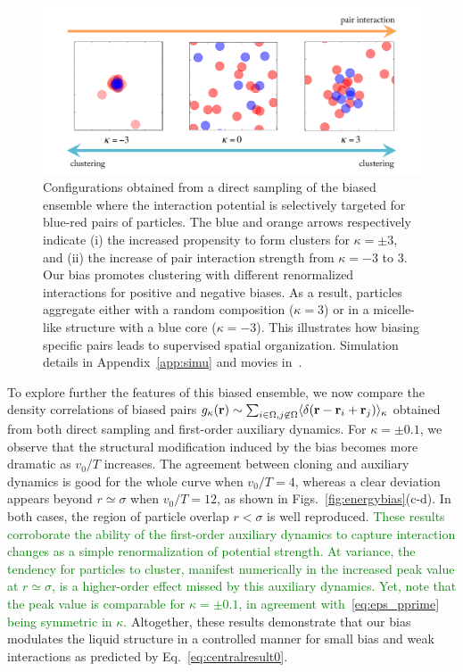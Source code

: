 \documentclass[superscriptaddress, twocolumn, prx, longbibliography, nofootinbib]{revtex4-1}
\begin{document}
\begin{figure}
	\centering
	\includegraphics[width=.9\linewidth]{fig4.pdf}
	\caption{\label{fig:outofperturbation}
	Configurations obtained from a direct sampling of the biased ensemble where the interaction potential is selectively targeted for blue-red pairs of particles. The blue and orange arrows respectively indicate (i) the increased propensity to form clusters for $\kappa=\pm3$, and (ii) the increase of pair interaction strength from $\kappa=-3$ to $3$. Our bias promotes clustering with different renormalized interactions for positive and negative biases. As a result, particles aggregate either with a random composition ($\kappa=3$) or in a micelle-like structure with a blue core ($\kappa=-3$). This illustrates how biasing specific pairs leads to supervised spatial organization.
		Simulation details in Appendix~\ref{app:simu} and movies in~\cite{movie}.
	}
\end{figure}


To explore further the features of this biased ensemble, we now compare the density correlations of biased pairs $g_\kappa({\bf r})\sim \sum_{i\in\Omega,j\not\in\Omega}\langle \delta({\bf r}-{\bf r}_i+{\bf r}_j)\rangle_\kappa$ obtained from both direct sampling and first-order auxiliary dynamics. For $\kappa=\pm0.1$, we observe that the structural modification induced by the bias becomes more dramatic as $v_0/T$ increases. The agreement between cloning and auxiliary dynamics is good for the whole curve when $v_0/T=4$, whereas a clear deviation appears beyond $r\simeq\sigma$ when $v_0/T=12$, as shown in Figs.~\ref{fig:energybias}(c-d). In both cases, the region of particle overlap $r<\sigma$ is well reproduced. \textcolor{green}{These results corroborate the ability of the first-order auxiliary dynamics to capture interaction changes as a simple renormalization of potential strength. At variance, the tendency for particles to cluster, manifest numerically in the increased peak value at $r\simeq\sigma$, is a higher-order effect missed by this auxiliary dynamics. Yet, note that the peak value is comparable for $\kappa=\pm0.1$, in agreement with~\eqref{eq:eps_pprime} being symmetric in $\kappa$.}
Altogether, these results demonstrate that our bias modulates the liquid structure in a controlled manner for small bias and weak interactions as predicted by Eq.~\ref{eq:centralresult0}.
\end{document}
